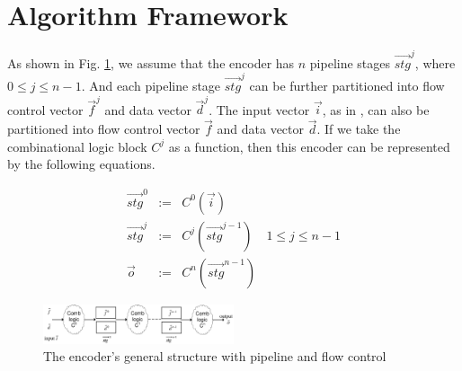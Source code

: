 \documentclass[conference]{IEEEtran}
\begin{document}




\section{Algorithm Framework}\label{sec_framework}


As shown in Fig. \ref{fig_pipeenc},
we assume that 
the encoder has $n$ pipeline stages $\vec{stg}^j$,
where $0\le j \le n-1$.
And each pipeline stage $\vec{stg}^j$ can be further partitioned into flow control vector $\vec{f}^j$ and data vector $\vec{d}^j$.
The input vector $\vec{i}$,
as in \cite{QinTODAES15},
can also be partitioned into flow control vector $\vec{f}$ and data vector $\vec{d}$.
If we take the combinational logic block $C^j$ as a function,
then this encoder can be represented by the following equations.

\begin{equation}\label{equ_genpipe}
\begin{array}{cccc}
\vec{stg}^0   & := & C^0(\vec{i})         &\\
\vec{stg}^j   & := & C^j(\vec{stg}^{j-1}) & 1\le j\le n-1\\
\vec{o}       & := & C^n(\vec{stg}^{n-1}) &
\end{array}
\end{equation}


\begin{figure}[b]
\begin{center}
\includegraphics[width=0.5\textwidth]{pipemod1}
\end{center}
\caption{The encoder's general structure with pipeline and flow control}
  \label{fig_pipeenc}
\end{figure}


% 
\end{document}
